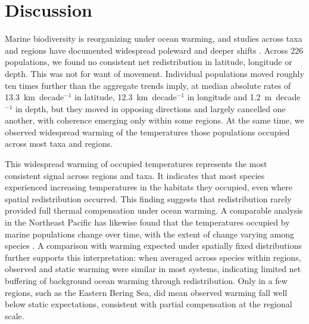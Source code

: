 \documentclass[9pt,twocolumn,twoside]{pnas-new}
\begin{document}
\section*{Discussion}

Marine biodiversity is reorganizing under ocean warming, and studies across taxa and regions have documented widespread poleward and deeper shifts \citep{poloczanska_global_2013, dulvy_climate_2008, poloczanska_responses_2016, perry_climate_2005}. Across 226 populations, we found no consistent net redistribution in latitude, longitude or depth. This was not for want of movement. Individual populations moved roughly ten times further than the aggregate trends imply, at median absolute rates of 13.3~km~decade$^{-1}$ in latitude, 12.3~km~decade$^{-1}$ in longitude and 1.2~m~decade$^{-1}$ in depth, but they moved in opposing directions and largely cancelled one another, with coherence emerging only within some regions. At the same time, we observed widespread warming of the temperatures those populations occupied across most taxa and regions.

This widespread warming of occupied temperatures represents the most consistent signal across regions and taxa. It indicates that most species experienced increasing temperatures in the habitats they occupied, even where spatial redistribution occurred. This finding suggests that redistribution rarely provided full thermal compensation under ocean warming. A comparable analysis in the Northeast Pacific has likewise found that the temperatures occupied by marine populations change over time, with the extent of change varying among species \citep{ward_win_2024}. A comparison with warming expected under spatially fixed distributions further supports this interpretation: when averaged across species within regions, observed and static warming were similar in most systems, indicating limited net buffering of background ocean warming through redistribution. Only in a few regions, such as the Eastern Bering Sea, did mean observed warming fall well below static expectations, consistent with partial compensation at the regional scale.
\end{document}

